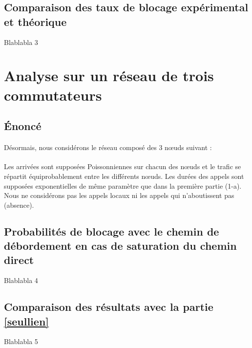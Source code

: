         \subsection{Comparaison des taux de blocage expérimental et théorique}
Blablabla 3
%
    \clearpage
%
%
%
    \section{Analyse sur un réseau de trois commutateurs}
%
        \subsection{Énoncé}
%
            \paragraph{}
Désormais, nous considérons le réseau composé des 3 nœuds suivant :
%
            \paragraph{}
Les arrivées sont supposées Poissonniennes sur chacun des nœuds et le trafic se répartit équiprobablement entre les différents nœuds.
Les durées des appels sont supposées exponentielles de même paramètre que dans la première partie (1-a).
Nous ne considérons pas les appels locaux ni les appels qui n'aboutissent pas (absence).
%
        \subsection{Probabilités de blocage avec le chemin de débordement en cas de saturation du chemin direct}
Blablabla 4
%
        \subsection{Comparaison des résultats avec la partie \ref{seullien}}
Blablabla 5

